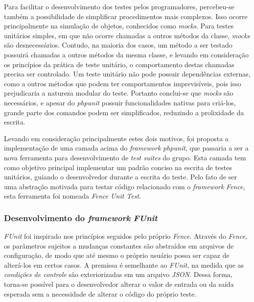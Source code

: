 Para facilitar o desenvolvimento dos testes pelos programadores, percebeu-se também a possibilidade de simplificar procedimentos mais complexos. Isso ocorre principalmente na simulação de objetos, conhecidos como \emph{mocks}. Para testes unitários simples, em que não ocorre chamadas a outros métodos da classe, \emph{mocks} são desnecessários. Contudo, na maioria dos casos, um método a ser testado possuirá chamadas a outros métodos da mesma classe, e levando em consideração os princípios da prática de teste unitário, o comportamento destas chamadas precisa ser controlado. Um teste unitário não pode possuir dependências externas, como a outros métodos que podem ter comportamentos imprevisíveis, pois isso prejudicaria a natureza modular do teste. Portanto conclui-se que \emph{mocks} são necessários, e apesar do \emph{phpunit} possuir funcionalidades nativas para criá-los, grande parte dos comandos podem ser simplificados, reduzindo a prolixidade da escrita.

Levando em consideração principalmente estes dois motivos, foi proposta a implementação de uma camada acima do \emph{framework} \emph{phpunit}, que passaria a ser a nova ferramenta para desenvolvimento de \emph{test suites} do grupo. Esta camada tem como objetivo principal implementar um padrão conciso na escrita de testes unitários, guiando o desenvolvedor durante a escrita do teste. Pelo fato de ser uma abstração motivada para testar código relacionado com o \emph{framework} \emph{Fence}, esta ferramenta foi nomeada \emph{Fence Unit Test}.

\hypertarget{desenvolvimento-do-framework-funit}{%
\subsubsection{\texorpdfstring{Desenvolvimento do \emph{framework} \emph{FUnit}}{Desenvolvimento do framework FUnit}}\label{desenvolvimento-do-framework-funit}}

\emph{FUnit} foi inspirado nos princípios seguidos pelo próprio \emph{Fence}. Através do \emph{Fence}, os parâmetros sujeitos a mudanças constantes são abstraídos em arquivos de configuração, de modo que até mesmo o próprio usuário possa ser capaz de alterá-los em certos casos. A premissa é semelhante ao \emph{FUnit}, na medida que as \emph{condições de controle} são exteriorizadas em um arquivo \emph{JSON}. Dessa forma, torna-se possível para o desenvolvedor alterar o valor de entrada ou da saída esperada sem a necessidade de alterar o código do próprio teste.

